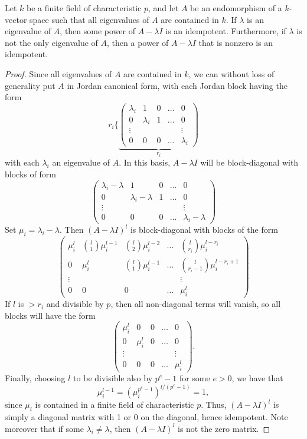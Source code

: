 \documentclass{article}
\let\l\lambda
\numberwithin{equation}{section}
\theoremstyle{theorem}
\numberwithin{thm}{section}
\theoremstyle{definition}
\begin{document}
\begin{lem}
\label{JordanLemma}
  Let $k$ be a finite field of characteristic $p$, and let $A$ be an endomorphism of a $k$-vector space such that all eigenvalues of $A$ are contained in $k$. If $\l$ is an eigenvalue of $A$, then some power of $A-\l I$ is an idempotent.
Furthermore, if $\l$ is not the only eigenvalue of $A$, then a power of $A-\l I$ that is nonzero is an idempotent.
\end{lem}
\begin{proof}
  Since all eigenvalues of $A$ are contained in $k$, we can without loss of generality put $A$ in Jordan canonical form, with each Jordan block having the form
  \[ r_i\Biggl\{
  \underbrace{\begin{pmatrix}
      \l_i & 1 & 0 & \dots & 0 \\
      0 & \l_i & 1  & \dots & 0 \\
      \vdots & & & & \vdots \\
      0 & 0 & 0 & \dots & \l_i
  \end{pmatrix}}_{r_i} \]
  with each $\l_i$ an eigenvalue of $A$.
  In this basis, $A-\l I$ will be block-diagonal with blocks of form
  \[ \begin{pmatrix}
    \l_i-\l & 1 & 0 & \dots & 0 \\
    0 & \l_i-\l & 1 & \dots & 0 \\
    \vdots & & & & \vdots \\
    0 & 0 & 0 & \dots & \l_i-\l
  \end{pmatrix} \]
  Set $\mu_i=\l_i-\l$. Then $(A-\l I)^l$ is block-diagonal with blocks of the form
  \[ \begin{pmatrix}
    \mu_i^l & \binom{l}1\mu_i^{l-1} & \binom{l}2\mu_i^{l-2} & \dots & \binom{l}{r_i}\mu_i^{l-r_i} \\
    0 & \mu_i^l & \binom{l}1\mu_i^{l-1} & \dots & \binom{l}{r_i-1}\mu_i^{l-r_i+1} \\
    \vdots & & & & \vdots \\
    0 & 0 & 0 & \dots & \mu_i^l
  \end{pmatrix} \]
  If $l$ is $> r_i$ and divisible by $p$, then all non-diagonal terms will vanish, so all blocks will have the form
  \[ \begin{pmatrix}
    \mu_i^l & 0 & 0 & \dots & 0 \\
    0 & \mu_i^l & 0 & \dots & 0 \\
    \vdots & & & & \vdots \\
    0 & 0 & 0 & \dots & \mu_i^l
  \end{pmatrix}. \]
  Finally, choosing $l$ to be divisible also by $p^e-1$ for some $e>0$, we have that $$\mu_i^{l-1} = (\mu_i^{p^{e}-1})^{l/(p^{e}-1)} =1,$$ since $\mu_i$ is contained in a finite field of characteristic $p$.
  Thus, $(A-\l I)^l$ is simply a diagonal matrix with 1 or 0 on the diagonal, hence idempotent. Note moreover that if some $\l_i\neq \l$, then $(A-\l I)^l$ is not the zero matrix.
\end{proof}
\end{document}
